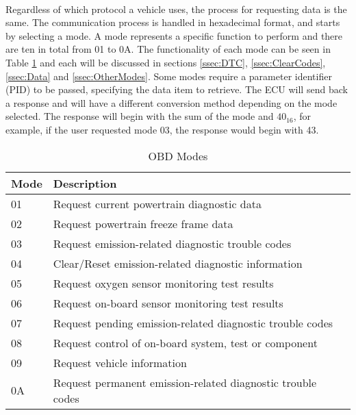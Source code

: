{		\paragraph{}{
		Regardless of which protocol a vehicle uses, the process for requesting data is the same. The communication process is handled in hexadecimal format, and starts by selecting a mode. A mode represents a specific function to perform and there are ten in total from 01 to 0A. The functionality of each mode can be seen in Table \ref{tab:Modes} and each will be discussed in sections \ref{ssec:DTC}, \ref{ssec:ClearCodes}, \ref{ssec:Data} and \ref{ssec:OtherModes}. Some modes require a parameter identifier (PID) to be passed, specifying the data item to retrieve. The ECU will send back a response and will have a different conversion method depending on the mode selected. The response will begin with the sum of the mode and $40 _{16}$, for example, if the user requested mode 03, the response would begin with 43.
		}
		\begin{table}[h]
			\begin{center}				
				\begin{tabular}{| l | l |}
				\hline
				\textbf{Mode} & \textbf{Description}\\
				\hline
				01 & Request current powertrain diagnostic data\\
				\hline
				02 & Request powertrain freeze frame data\\
				\hline
				03 & Request emission-related diagnostic trouble codes\\
				\hline
				04 & Clear/Reset emission-related diagnostic information\\
				\hline
				05 & Request oxygen sensor monitoring test results\\
				\hline
				06 & Request on-board sensor monitoring test results\\
				\hline
				07 & Request pending emission-related diagnostic trouble codes\\
				\hline
				08 & Request control of on-board system, test or component\\
				\hline
				09 & Request vehicle information\\
				\hline
				0A & Request permanent emission-related diagnostic trouble codes\\
				\hline
				\end{tabular}
				\caption{OBD Modes}
				\label{tab:Modes}
			\end{center}
		\end{table}		 
		
}
